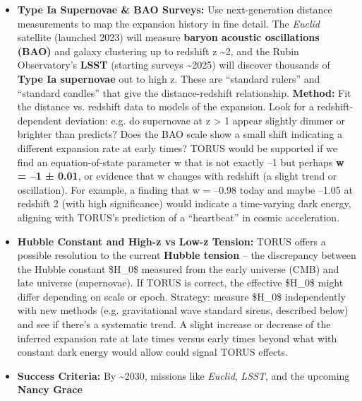\documentclass[
]{article}
\begin{document}
\begin{itemize}
  \begin{itemize}
  \item
    \textbf{Type Ia Supernovae \& BAO Surveys:} Use next-generation
    distance measurements to map the expansion history in fine detail.
    The \emph{Euclid} satellite (launched 2023) will measure
    \textbf{baryon acoustic oscillations (BAO)} and galaxy clustering up
    to redshift z \textasciitilde2, and the Rubin Observatory's
    \textbf{LSST} (starting surveys \textasciitilde2025) will discover
    thousands of \textbf{Type Ia supernovae} out to high z. These are
    ``standard rulers'' and ``standard candles'' that give the
    distance-redshift relationship. \textbf{Method:} Fit the distance
    vs. redshift data to models of the expansion. Look for a
    redshift-dependent deviation: e.g. do supernovae at z \textgreater{}
    1 appear slightly dimmer or brighter than \LambdaCDM predicts? Does the
    BAO scale show a small shift indicating a different expansion rate
    at early times? TORUS would be supported if we find an
    equation-of-state parameter w that is not exactly --1 but perhaps
    \textbf{w = --1 ± 0.01}, or evidence that w changes with redshift (a
    slight trend or oscillation)\hspace{0pt}. For example, a finding
    that w = --0.98 today and maybe --1.05 at redshift 2 (with high
    significance) would indicate a time-varying dark energy, aligning
    with TORUS's prediction of a ``heartbeat'' in cosmic
    acceleration\hspace{0pt}.
  \item
    \textbf{Hubble Constant and High-z vs Low-z Tension:} TORUS offers a
    possible resolution to the current \textbf{Hubble tension} -- the
    discrepancy between the Hubble constant \$H\_0\$ measured from the
    early universe (CMB) and late universe (supernovae)\hspace{0pt}. If
    TORUS is correct, the effective \$H\_0\$ might differ depending on
    scale or epoch. Strategy: measure \$H\_0\$ independently with new
    methods (e.g. gravitational wave standard sirens, described below)
    and see if there's a systematic trend. A slight increase or decrease
    of the inferred expansion rate at late times versus early times
    beyond what \LambdaCDM with constant dark energy would allow could signal
    TORUS effects\hspace{0pt}.
  \item
    \textbf{Success Criteria:} By \textasciitilde2030, missions like
    \emph{Euclid}, \emph{LSST}, and the upcoming \textbf{Nancy Grace
}
\end{itemize}
\end{itemize}
\end{document}
